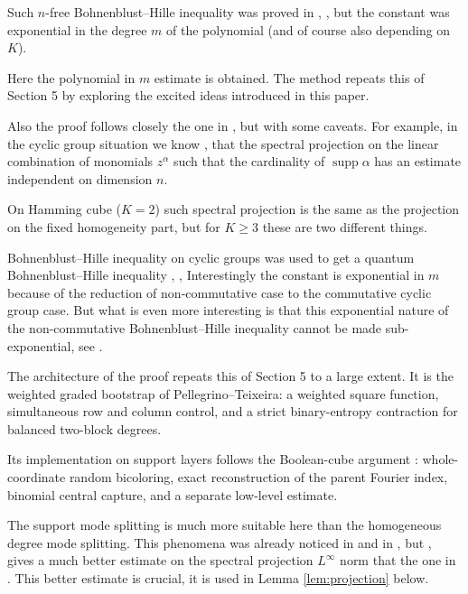 \documentclass[11pt]{article}
\theoremstyle{definition}
\theoremstyle{remark}
\newcommand{\supp}{\operatorname{supp}}
\begin{document}
Such $n$-free Bohnenblust--Hille inequality was proved in \cite{BeckerKleinSloteVolbergZhang}, \cite{SloteVolbergZhang}, 
but the constant was exponential in the degree $m$ of the polynomial (and of course also depending on $K$).

Here the polynomial in $m$ estimate is obtained. The method repeats this of \cite{PellegrinoTeixeira} Section 5 by exploring the excited ideas introduced in this paper.

Also the proof follows closely the one in \cite{SloteVolberg}, but with some caveats. For example, 
in the cyclic group situation we know \cite{SloteVolbergZhang}, \cite{DefantEtAlHamming} that the spectral projection on the linear combination of monomials
$z^\alpha$ such that the cardinality  of $\supp\alpha$  has an estimate independent on dimension $n$. 

On Hamming cube ($K=2$) such spectral projection is the same as the projection on the fixed homogeneity part, but for $K\ge 3$
these are two different things.

\medskip

Bohnenblust--Hille inequality on cyclic groups was used to get a quantum Bohnenblust--Hille inequality \cite{SloteVolbergZhangNC}, \cite{SloteVolbergZhang},
Interestingly the constant is exponential in $m$ because of the reduction of non-commutative case to the commutative cyclic group case. 
But what is even more interesting is that this exponential nature of the non-commutative Bohnenblust--Hille inequality cannot be made sub-exponential, see \cite{Slote}.

\medskip

The architecture of the proof repeats this of \cite{PellegrinoTeixeira} Section 5 to a large extent. It is the weighted graded bootstrap of
Pellegrino--Teixeira: a weighted square function, simultaneous row and column
control, 
and a strict binary-entropy contraction for
balanced two-block degrees.  

Its implementation on support layers follows the
Boolean-cube  argument \cite{SloteVolberg}: whole-coordinate random bicoloring, exact
reconstruction of the parent Fourier index, binomial central capture, 
and a separate low-level estimate.  

The support mode splitting is much more suitable here than the homogeneous degree mode splitting. This phenomena 
was already noticed in \cite{SloteVolbergZhang} and in \cite{DefantEtAlHamming}, but  \cite{DefantEtAlHamming}, gives a much better estimate
on the spectral projection $L^\infty$ norm that the one in \cite{SloteVolbergZhang}. This better estimate is crucial, it is used in Lemma \ref{lem:projection} below.
\end{document}
